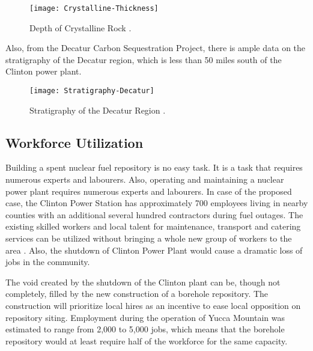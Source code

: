 \begin{figure}[!h] 
  \centering
  \texttt{[image: Crystalline-Thickness]}	
  \caption{Depth of Crystalline Rock
  \cite{perry_gis_2015}.}
  \label{fig:Depth}
\end{figure}

 \fi
  
  
  Also, from the Decatur Carbon Sequestration Project, there is ample data
  on the stratigraphy of the Decatur region, which is less than 50 miles south
  of the Clinton power plant.
 
  
  
  
\begin{figure}[!h] 
  \centering
  \texttt{[image: Stratigraphy-Decatur]}	
  \caption{Stratigraphy of the Decatur Region
  \cite{mcdonald_illinois_2012}.}
  \label{fig:Stratigraphy}
\end{figure}
  

\subsection{Workforce Utilization}



Building a spent nuclear fuel repository is no easy task. It is a task that requires
numerous experts and labourers. Also, operating and maintaining a nuclear power plant
requires numerous experts and labourers. In case of the proposed case, the Clinton
 Power Station has approximately 700 employees living in nearby counties with an
additional several hundred contractors during fuel 
outages\cite{exelon_clinton_2016}.
The existing skilled workers and local talent for maintenance, transport and catering
services can be utilized without bringing a whole new group of workers to the 
area \cite{iaea_managing_2008}. Also, the shutdown of Clinton Power Plant would cause a dramatic
loss of jobs in the community. 




The void created by the shutdown of the Clinton plant can be, though not
completely, filled by the new construction of a borehole repository. The construction
will prioritize local hires as an incentive to ease local opposition on repository
 siting. Employment during the operation of Yucca Mountain was estimated to range from
 2,000 to 5,000 jobs, \cite{riddel_economic_2003} which means that the borehole repository
 would at least require half of the workforce for the same capacity. 

